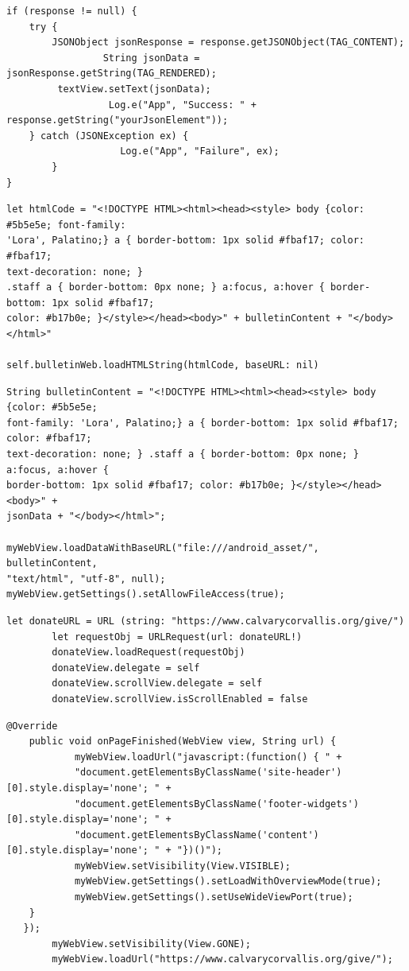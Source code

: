 \documentclass[letterpaper,10pt,draftclsnofoot,onecolumn,titlepage]{IEEEtran}
\begin{document}
\begin{lstlisting}[caption=Android JSON Parser]
if (response != null) {
	try {
		JSONObject jsonResponse = response.getJSONObject(TAG_CONTENT);
                 String jsonData = jsonResponse.getString(TAG_RENDERED);
		 textView.setText(jsonData);
                  Log.e("App", "Success: " + response.getString("yourJsonElement"));
	} catch (JSONException ex) {
                    Log.e("App", "Failure", ex);
        }
}
\end{lstlisting}

\begin{lstlisting}[caption=iOS Load into WebView]
let htmlCode = "<!DOCTYPE HTML><html><head><style> body {color: #5b5e5e; font-family:
'Lora', Palatino;} a { border-bottom: 1px solid #fbaf17; color: #fbaf17;
text-decoration: none; }
.staff a { border-bottom: 0px none; } a:focus, a:hover { border-bottom: 1px solid #fbaf17;
color: #b17b0e; }</style></head><body>" + bulletinContent + "</body></html>"

self.bulletinWeb.loadHTMLString(htmlCode, baseURL: nil)
		\end{lstlisting}

\begin{lstlisting}[caption=Android Load into WebView]
String bulletinContent = "<!DOCTYPE HTML><html><head><style> body {color: #5b5e5e;
font-family: 'Lora', Palatino;} a { border-bottom: 1px solid #fbaf17; color: #fbaf17;
text-decoration: none; } .staff a { border-bottom: 0px none; } a:focus, a:hover {
border-bottom: 1px solid #fbaf17; color: #b17b0e; }</style></head><body>" +
jsonData + "</body></html>";

myWebView.loadDataWithBaseURL("file:///android_asset/", bulletinContent,
"text/html", "utf-8", null);
myWebView.getSettings().setAllowFileAccess(true);
\end{lstlisting}


\begin{lstlisting}[caption=iOS Donation Page]
 	let donateURL = URL (string: "https://www.calvarycorvallis.org/give/")
        let requestObj = URLRequest(url: donateURL!)
        donateView.loadRequest(requestObj)
        donateView.delegate = self
        donateView.scrollView.delegate = self
        donateView.scrollView.isScrollEnabled = false
\end{lstlisting}

\begin{lstlisting}[caption=Android Donation Page]
@Override
    public void onPageFinished(WebView view, String url) {
            myWebView.loadUrl("javascript:(function() { " +
            "document.getElementsByClassName('site-header')[0].style.display='none'; " +
            "document.getElementsByClassName('footer-widgets')[0].style.display='none'; " +
            "document.getElementsByClassName('content')[0].style.display='none'; " + "})()");
            myWebView.setVisibility(View.VISIBLE);
            myWebView.getSettings().setLoadWithOverviewMode(true);
            myWebView.getSettings().setUseWideViewPort(true);
   	}
   });
        myWebView.setVisibility(View.GONE);
        myWebView.loadUrl("https://www.calvarycorvallis.org/give/");
\end{lstlisting}
\end{document}
